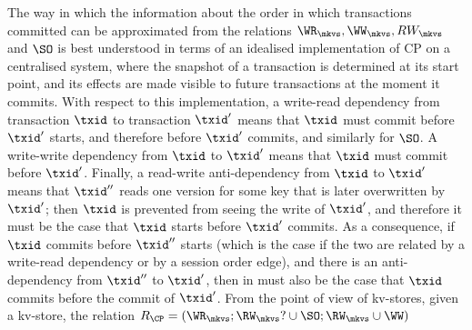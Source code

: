 The way in which the information about the order in which transactions 
committed can be approximated from the relations $\WR_{\mkvs}, \WW_{\mkvs}, 
RW_{\mkvs}$ and $\SO$ is best understood in terms of an idealised implementation of 
CP on a centralised system, 
where the snapshot of a transaction is determined at its start point, and its effects are made visible 
to future transactions at the moment it commits. 
With respect to this implementation, a write-read dependency from transaction $\txid$ to transaction $\txid'$ 
means that 
$\txid$ {must} commit before $\txid'$ starts, and therefore before $\txid'$ commits,
and similarly for $\SO$.
% 
A write-write dependency from $\txid$ to $\txid'$ means that $\txid$ {must} commit before $\txid'$. 
Finally, a read-write anti-dependency from $\txid$ to $\txid'$ 
means that $\txid''$ reads one version for some key that 
is later overwritten by $\txid'$; then $\txid$ is prevented from seeing the write of $\txid'$, 
and therefore it {must} be the case that $\txid$ starts before 
$\txid'$ commits. 
As a consequence, if $\txid$ commits before $\txid''$ starts (which is the case if the two are 
related by a write-read dependency or by a session order edge), and there is an anti-dependency 
from $\txid''$ to $\txid'$, then in {must} also be the case that $\txid$ commits before 
the commit of $\txid'$.
From the point of view of kv-stores, given a kv-store, the relation $R_{\CP} = (\WR_{\mkvs}; \RW_{\mkvs}? \cup \SO;  \RW_{\mkvs} \cup \WW)$ 
